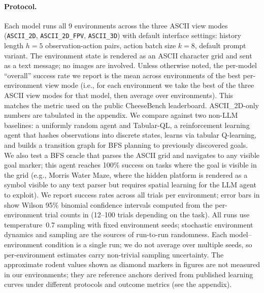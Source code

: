 \documentclass[letterpaper]{article}
\begin{document}
\paragraph{Protocol.}
Each model runs all 9 environments across the three ASCII view modes (\texttt{ASCII\_2D}, \texttt{ASCII\_2D\_FPV}, \texttt{ASCII\_3D}) with default interface settings: history length $h{=}5$ observation-action pairs, action batch size $k{=}8$, default prompt variant.
The environment state is rendered as an ASCII character grid and sent as a text message; no images are involved.
Unless otherwise noted, the per-model ``overall'' success rate we report is the mean across environments of the best per-environment view mode (i.e., for each environment we take the best of the three ASCII view modes for that model, then average over environments).
This matches the metric used on the public CheeseBench leaderboard. ASCII\_2D-only numbers are tabulated in the \emph{} appendix.
We compare against two non-LLM baselines: a uniformly random agent and Tabular-QL, a reinforcement learning agent that hashes observations into discrete states, learns via tabular Q-learning, and builds a transition graph for BFS planning to previously discovered goals.
We also test a BFS oracle that parses the ASCII grid and navigates to any visible goal marker; this agent reaches 100\% success on tasks where the goal is visible in the grid (e.g., Morris Water Maze, where the hidden platform is rendered as a symbol visible to any text parser but requires spatial learning for the LLM agent to exploit).
We report success rates across all trials per environment; error bars in  show Wilson 95\% binomial confidence intervals computed from the per-environment trial counts in  (12--100 trials depending on the task).
All runs use temperature~0.7 sampling with fixed environment seeds; stochastic environment dynamics and sampling are the sources of run-to-run randomness.
Each model--environment condition is a single run; we do not average over multiple seeds, so per-environment estimates carry non-trivial sampling uncertainty.
The approximate rodent values shown as diamond markers in figures are not measured in our environments; they are reference anchors derived from published learning curves under different protocols and outcome metrics (see the \emph{} appendix).
\end{document}
